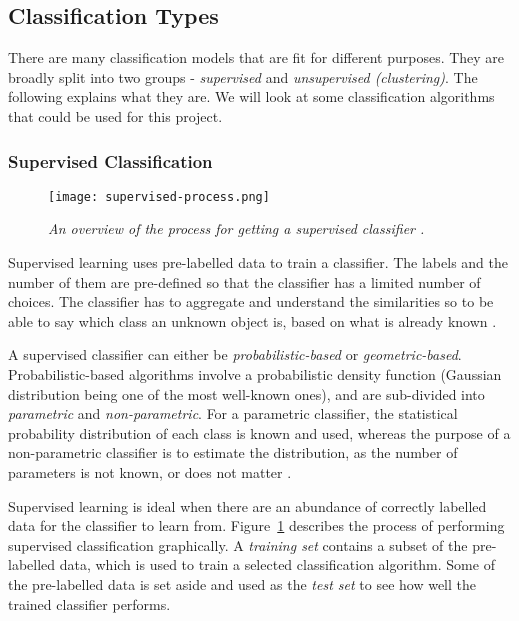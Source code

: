 \subsection{Classification Types}
There are many classification models that are fit for different purposes. They are broadly split into two groups - \textit{supervised} and \textit{unsupervised (clustering)}. The following explains what they are. We will look at some classification algorithms that could be used for this project.

\subsubsection{Supervised Classification}

\begin{figure}[h]
  \centering\texttt{[image: supervised-process.png]}
  \caption{\textit{An overview of the process for getting a supervised classifier \protect\cite{class-analysis}.}}
  \label{fig:supervised-process}
\end{figure}
Supervised learning uses pre-labelled data to train a classifier. The labels and the number of them are pre-defined so that the classifier has a limited number of choices. The classifier has to aggregate and understand the similarities so to be able to say which class an unknown object is, based on what is already known \cite{class-analysis}.

A supervised classifier can either be \textit{probabilistic-based} or \textit{geometric-based}. Probabilistic-based algorithms involve a probabilistic density function (Gaussian distribution being one of the most well-known ones), and are sub-divided into \textit{parametric} and \textit{non-parametric}. For a parametric classifier, the statistical probability distribution of each class is known and used, whereas the purpose of a non-parametric classifier is to estimate the distribution, as the number of parameters is not known, or does not matter \cite{class-analysis} \cite{hall-notes}.

Supervised learning is ideal when there are an abundance of correctly labelled data for the classifier to learn from. Figure~\ref{fig:supervised-process} describes the process of performing supervised classification graphically. A \textit{training set} contains a subset of the pre-labelled data, which is used to train a selected classification algorithm. Some of the pre-labelled data is set aside and used as the \textit{test set} to see how well the trained classifier performs. 

